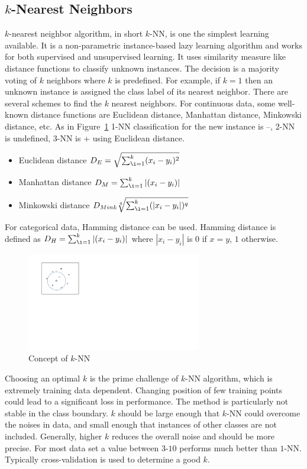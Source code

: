 \subsection*{$k$-Nearest Neighbors}
$k$-nearest neighbor algorithm, in short $k$-NN, is one the simplest learning available. It is a non-parametric instance-based lazy learning algorithm and works for both supervised and unsupervised learning. It uses similarity measure like distance functions to classify unknown instances. The decision is a majority voting of  $k$ neighbors where $k$ is predefined. For example, if $k= 1$ then an unknown instance is assigned the class label of its nearest neighbor. There are several schemes to find the $k$ nearest neighbors. For continuous data, some well-known distance functions are Euclidean distance, Manhattan distance, Minkowski distance, etc.  As in Figure~\ref{fig:bg:knn} 1-NN classification for the new instance is {--}, 2-NN is undefined, 3-NN is {+} using Euclidean distance.
\begin{itemize}
    \item Euclidean distance $D_E = \sqrt{\sum_{\i =1 }^{k} (x_i - y_i)^2}$
    \item Manhattan distance $D_M = \sum_{\i =1 }^{k} |(x_i - y_i)|$
    \item Minkowski distance $D_{Mink}\sqrt[q]{\sum_{\i =1 }^{k} (|x_i - y_i|)^q}$
\end{itemize}
For categorical data, Hamming distance can be used. Hamming distance is defined as $D_H = \sum_{\i =1 }^{k} |(x_i - y_i)|$ where $|x_i - y_i|$ is $0$ if $x=y$, $1$ otherwise.

\begin{figure}[htbp]
    \begin{center}
        \includegraphics[width=3.0in]{figs/knn.pdf}
        \caption{Concept of $k$-NN}
        \label{fig:bg:knn}
    \end{center}
\end{figure}

Choosing an optimal $k$ is the prime challenge of $k$-NN algorithm, which is extremely training data dependent. Changing position of few training points could lead to a significant loss in performance. The method is particularly not stable in the class boundary. $k$ should be large enough that $k$-NN could overcome the noises in data, and small enough that instances of other classes are not included. Generally, higher $k$ reduces the overall noise and should be more precise. For most data set a value between $3$-$10$ performs much better than $1$-NN. Typically cross-validation is used to determine a good $k$. 

